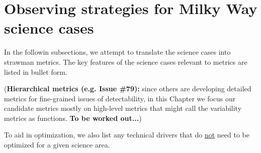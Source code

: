 %


\section{Observing strategies for Milky Way science cases}
\def\secname{strategies}\label{sec:\secname}

In the followin subsections, we attempt to translate the science cases
into strawman metrics. The key features of the science cases relevant
to metrics are listed in bullet form.

({\bf Hierarchical metrics (e.g. Issue \#79):} since others are
developing detailed metrics for fine-grained issues of detectability,
in this Chapter we focus our candidate metrics mostly on high-level
metrics that might call the variability metrics as functions. {\bf To
  be worked out...})


To aid in optimization, we also list any technical drivers that do
\underline{not} need to be optimized for a given science area.

